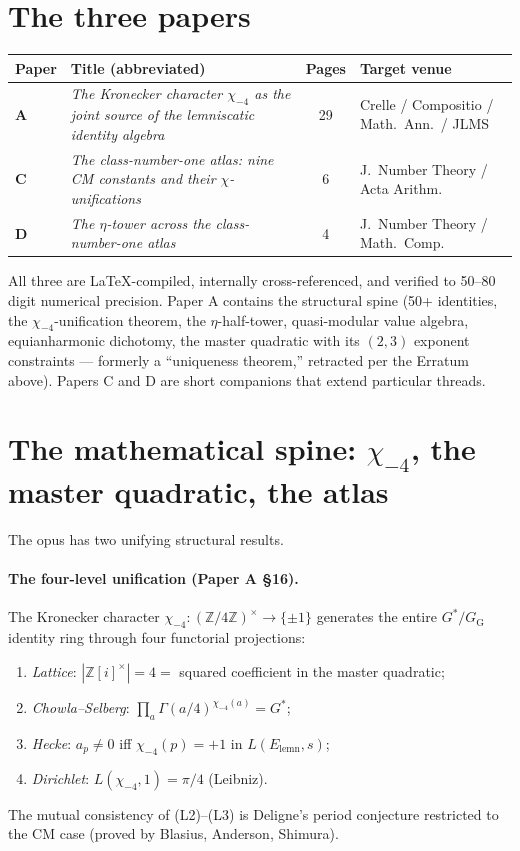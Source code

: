 \documentclass[11pt]{amsart}
\newcommand{\Gs}{G^{*}}
\newcommand{\GG}{G_{\!\scriptscriptstyle\mathrm{G}}}
\newcommand{\Z}{\mathbb{Z}}
\begin{document}
\section{The three papers}

\begin{center}
\renewcommand{\arraystretch}{1.3}
\begin{tabular}{>{\bfseries}l l c l}
\toprule
Paper & Title (abbreviated) & Pages & Target venue \\
\midrule
A & \emph{The Kronecker character $\chi_{-4}$ as the joint source of the lemniscatic identity algebra} & 29 & Crelle / Compositio / Math.\ Ann.\ / JLMS \\
C & \emph{The class-number-one atlas: nine CM constants and their $\chi$-unifications} & 6 & J.\ Number Theory / Acta Arithm.\ \\
D & \emph{The $\eta$-tower across the class-number-one atlas} & 4 & J.\ Number Theory / Math.\ Comp.\ \\
\bottomrule
\end{tabular}
\end{center}

All three are LaTeX-compiled, internally cross-referenced, and verified to
50--80 digit numerical precision. Paper A contains the structural spine
(50+ identities, the $\chi_{-4}$-unification theorem, the $\eta$-half-tower,
quasi-modular value algebra, equianharmonic dichotomy, the master
quadratic with its $(2, 3)$ exponent constraints --- formerly a
``uniqueness theorem,'' retracted per the Erratum above). Papers C and D are short
companions that extend particular threads.

\section{The mathematical spine: $\chi_{-4}$, the master quadratic, the atlas}

The opus has two unifying structural results.

\paragraph{The four-level unification (Paper A \S 16).} The Kronecker
character $\chi_{-4}: (\Z/4\Z)^{\times} \to \{\pm 1\}$ generates the
entire $\Gs/\GG$ identity ring through four functorial projections:
\begin{enumerate}[label=\textup{(L\arabic*)}, leftmargin=*, itemsep=2pt]
\item \emph{Lattice}: $|\Z[i]^{\times}| = 4 = $ squared coefficient in the master quadratic;
\item \emph{Chowla--Selberg}: $\prod_{a} \Gamma(a/4)^{\chi_{-4}(a)} = \Gs$;
\item \emph{Hecke}: $a_p \neq 0$ iff $\chi_{-4}(p) = +1$ in $L(E_{\mathrm{lemn}}, s)$;
\item \emph{Dirichlet}: $L(\chi_{-4}, 1) = \pi/4$ (Leibniz).
\end{enumerate}
The mutual consistency of (L2)--(L3) is Deligne's period conjecture
restricted to the CM case (proved by Blasius, Anderson, Shimura).
\end{document}
